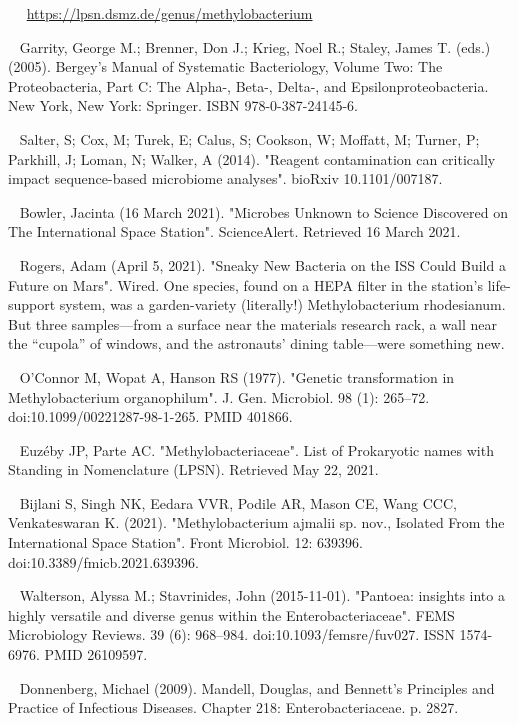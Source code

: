 \documentclass[11pt]{article}
\begin{document}
\begin{thebibliography}{3}
	~
	~\url{https://lpsn.dsmz.de/genus/methylobacterium}
	
	~ Garrity, George M.; Brenner, Don J.; Krieg, Noel R.; Staley, James T. (eds.) (2005). Bergey's Manual of Systematic Bacteriology, Volume Two: The Proteobacteria, Part C: The Alpha-, Beta-, Delta-, and Epsilonproteobacteria. New York, New York: Springer. ISBN 978-0-387-24145-6.
	
	~ Salter, S; Cox, M; Turek, E; Calus, S; Cookson, W; Moffatt, M; Turner, P; Parkhill, J; Loman, N; Walker, A (2014). "Reagent contamination can critically impact sequence-based microbiome analyses". bioRxiv 10.1101/007187.
	
	~ Bowler, Jacinta (16 March 2021). "Microbes Unknown to Science Discovered on The International Space Station". ScienceAlert. Retrieved 16 March 2021.
	
	~ Rogers, Adam (April 5, 2021). "Sneaky New Bacteria on the ISS Could Build a Future on Mars". Wired. One species, found on a HEPA filter in the station’s life-support system, was a garden-variety (literally!) Methylobacterium rhodesianum. But three samples—from a surface near the materials research rack, a wall near the “cupola” of windows, and the astronauts' dining table—were something new.
	
	~ O'Connor M, Wopat A, Hanson RS (1977). "Genetic transformation in Methylobacterium organophilum". J. Gen. Microbiol. 98 (1): 265–72. doi:10.1099/00221287-98-1-265. PMID 401866.
	
	~ Euzéby JP, Parte AC. "Methylobacteriaceae". List of Prokaryotic names with Standing in Nomenclature (LPSN). Retrieved May 22, 2021.
	
	~ Bijlani S, Singh NK, Eedara VVR, Podile AR, Mason CE, Wang CCC, Venkateswaran K. (2021). "Methylobacterium ajmalii sp. nov., Isolated From the International Space Station". Front Microbiol. 12: 639396. doi:10.3389/fmicb.2021.639396.
	
	~ Walterson, Alyssa M.; Stavrinides, John (2015-11-01). "Pantoea: insights into a highly versatile and diverse genus within the Enterobacteriaceae". FEMS Microbiology Reviews. 39 (6): 968–984. doi:10.1093/femsre/fuv027. ISSN 1574-6976. PMID 26109597.
	
	~ Donnenberg, Michael (2009). Mandell, Douglas, and Bennett's Principles and Practice of Infectious Diseases. Chapter 218: Enterobacteriaceae. p. 2827.


\end{thebibliography}
\end{document}
